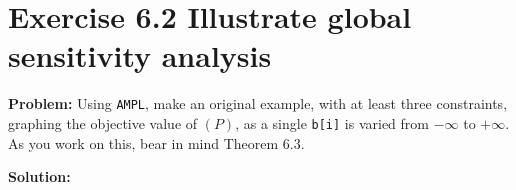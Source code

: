 \section{Exercise 6.2 Illustrate global sensitivity analysis}
\textbf{Problem:} Using {\tt AMPL}, make an original example, with at least three constraints, graphing the objective value of $(P)$, as a single {\tt b[i]} is varied from $-\infty$ to $+\infty$. As you work on this, bear in mind Theorem 6.3.

\textbf{Solution:}  
